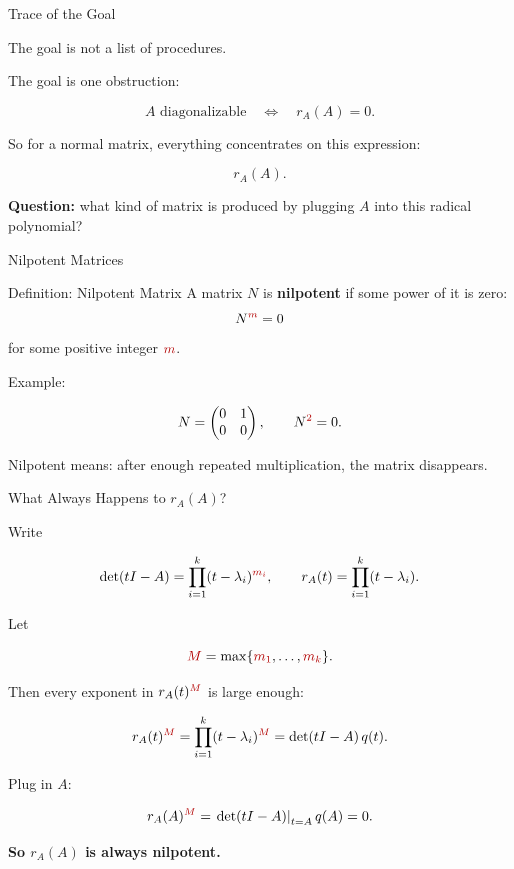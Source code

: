 \documentclass[10pt]{beamer}
\theoremstyle{definition}
\newcommand{\x}[1]{\alert{\textbf{#1}}}
\newcommand{\rd}[1]{{\color{red!70!black}#1}}
\begin{document}
\begin{frame}{Trace of the Goal}

The goal is not a list of procedures.

\vfill

The goal is one obstruction:

$$
A\text{ diagonalizable}
\quad\Longleftrightarrow\quad
r_A(A)=0.
$$

\vfill\pause

So for a normal matrix, everything concentrates on this expression:

$$
\boxed{r_A(A)}.
$$

\vfill

\x{Question:} what kind of matrix is produced by plugging $A$ into this radical polynomial?

\end{frame}


\begin{frame}{Nilpotent Matrices}

\begin{block}{Definition: Nilpotent Matrix}
A matrix $N$ is \x{nilpotent} if some power of it is zero:
$$
N^{\rd{m}}=0
$$
for some positive integer $\rd{m}$.
\end{block}

\vfill

Example:

$$
N=\begin{pmatrix}0&1\\0&0\end{pmatrix},
\qquad
N^{\rd{2}}=0.
$$

\vfill

Nilpotent means: after enough repeated multiplication, the matrix disappears.

\end{frame}


\begin{frame}[shrink=6]{What Always Happens to $r_A(A)$?}

Write

$$
\det(tI-A)=\prod_{i=1}^k(t-\lambda_i)^{\rd{m_i}},
\qquad
r_A(t)=\prod_{i=1}^k(t-\lambda_i).
$$

\vfill\pause

Let

$$
\rd{M}=\max\{\rd{m_1},\ldots,\rd{m_k}\}.
$$

\vfill

Then every exponent in $r_A(t)^{\rd{M}}$ is large enough:

$$
r_A(t)^{\rd{M}}
=\prod_{i=1}^k(t-\lambda_i)^{\rd{M}}
=\det(tI-A)\,q(t).
$$

\vfill\pause

Plug in $A$:

$$
r_A(A)^{\rd{M}}=\left.\det(tI-A)\right|_{t=A}q(A)=0.
$$

\vfill

\x{So $r_A(A)$ is always nilpotent.}

\end{frame}
\end{document}
